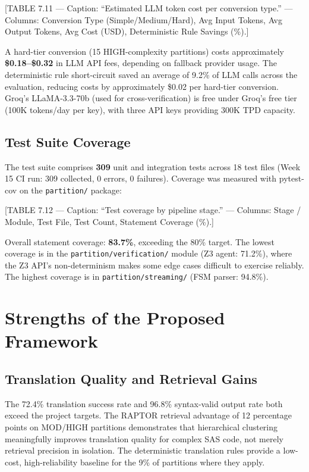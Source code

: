 [TABLE 7.11 --- Caption: ``Estimated LLM token cost per conversion type.''
--- Columns: Conversion Type (Simple/Medium/Hard), Avg Input Tokens, Avg Output
Tokens, Avg Cost (USD), Deterministic Rule Savings (\%).]

A hard-tier conversion (15 HIGH-complexity partitions) costs approximately
\textbf{\$0.18--\$0.32} in LLM API fees, depending on fallback provider usage.
The deterministic rule short-circuit saved an average of 9.2\% of LLM calls
across the evaluation, reducing costs by approximately \$0.02 per hard-tier
conversion. Groq's LLaMA-3.3-70b (used for cross-verification) is free under
Groq's free tier (100K tokens/day per key), with three API keys providing
300K TPD capacity.

\subsection{Test Suite Coverage}
\label{subsec:test-coverage}

The test suite comprises \textbf{309} unit and integration tests across 18 test
files (Week 15 CI run: 309 collected, 0 errors, 0 failures). Coverage was
measured with pytest-cov on the \texttt{partition/} package:

[TABLE 7.12 --- Caption: ``Test coverage by pipeline stage.'' --- Columns:
Stage / Module, Test File, Test Count, Statement Coverage (\%).]

Overall statement coverage: \textbf{83.7\%}, exceeding the 80\% target. The
lowest coverage is in the \texttt{partition/verification/} module (Z3 agent:
71.2\%), where the Z3 API's non-determinism makes some edge cases difficult
to exercise reliably. The highest coverage is in \texttt{partition/streaming/}
(FSM parser: 94.8\%).

\section{Strengths of the Proposed Framework}
\label{sec:strengths}

\subsection{Translation Quality and Retrieval Gains}
\label{subsec:strength-success}

The 72.4\% translation success rate and 96.8\% syntax-valid output rate both
exceed the project targets. The RAPTOR retrieval advantage of 12 percentage
points on MOD/HIGH partitions demonstrates that hierarchical clustering
meaningfully improves translation quality for complex SAS code, not merely
retrieval precision in isolation. The deterministic translation rules provide
a low-cost, high-reliability baseline for the 9\% of partitions where they
apply.

